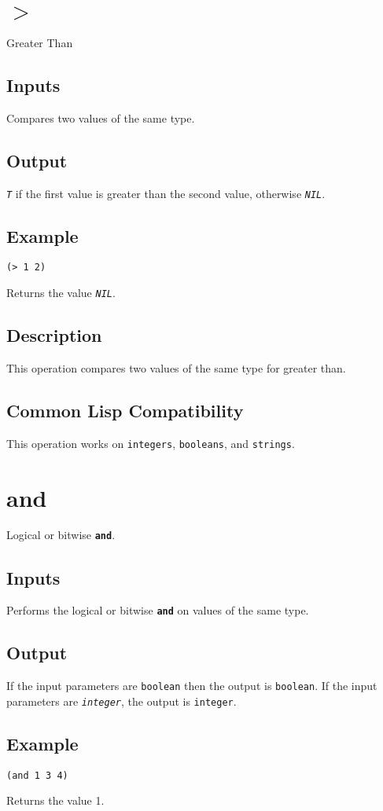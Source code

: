 \documentclass[10pt, openany]{book}
\newcommand{\operation}[1]{\textbf{\texttt{#1}}}
\newcommand{\constant}[1]{\emph{\texttt{#1}}}
\newcommand{\datatype}[1]{\texttt{#1}}
\begin{document}
\section{$>$}
Greater Than
\subsection{Inputs}
Compares two values of the same type.
\subsection{Output}
\constant{T} if the first value is greater than the second value, otherwise \constant{NIL}.
\subsection{Example}
\begin{lstlisting}
(> 1 2)
\end{lstlisting}
Returns the value \constant{NIL}.
\subsection{Description}
This operation compares two values of the same type for greater than.
\subsection{Common Lisp Compatibility}
This operation works on \datatype{integers}, \datatype{booleans}, and \datatype{strings}.

\section{and}
Logical or bitwise \operation{and}.
\subsection{Inputs}
Performs the logical or bitwise \operation{and} on values of the same type.
\subsection{Output}
If the input parameters are \datatype{boolean} then the output is \datatype{boolean}.  If the input parameters are \constant{integer}, the output is \datatype{integer}.
\subsection{Example}
\begin{lstlisting}
(and 1 3 4)
\end{lstlisting}
Returns the value 1.
\end{document}
